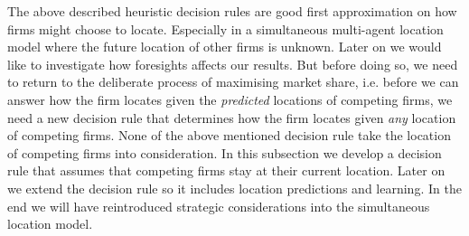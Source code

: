 \documentclass[preprint, 12pt]{elsarticle}
\begin{document}
The above described heuristic decision rules are good first approximation on how firms might choose to locate. Especially in a simultaneous multi-agent location model where the future location of other firms is unknown. Later on we would like to investigate how foresights affects our results. But before doing so, we need to return to the deliberate process of maximising market share, i.e. before we can answer how the firm locates given the \emph{predicted} locations of competing firms, we need a new decision rule that determines how the firm locates given \emph{any} location of competing firms. None of the above mentioned decision rule take the location of competing firms into consideration. In this subsection we develop a decision rule that assumes that competing firms stay at their current location. Later on we extend the decision rule so it includes location predictions and learning. In the end we will have reintroduced strategic considerations into the simultaneous location model.
\end{document}

